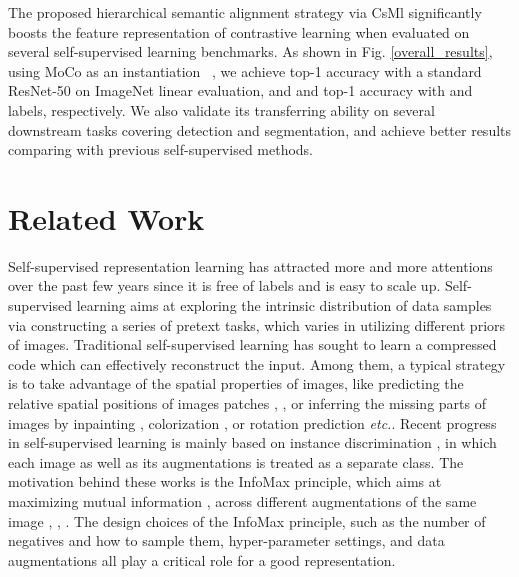 \documentclass[10pt,twocolumn,letterpaper]{article}
\begin{document}
The proposed hierarchical semantic alignment strategy via CsMl significantly boosts the feature representation of contrastive learning when evaluated on several self-supervised learning benchmarks. As shown in Fig. \ref{overall_results}, using MoCo as an instantiation  \cite{he2020momentum}, we achieve  top-1 accuracy with a standard ResNet-50 on ImageNet linear evaluation, and  and  top-1 accuracy with  and  labels, respectively. We also validate its transferring ability on several downstream tasks covering detection and segmentation, and achieve better results comparing with previous self-supervised methods.

\section{Related Work}
Self-supervised representation learning has attracted more and more attentions over the past few years since it is free of labels and is easy to scale up. Self-supervised learning aims at exploring the intrinsic distribution of data samples via constructing a series of pretext tasks, which varies in utilizing different priors of images. Traditional self-supervised learning has sought to learn a compressed code which can effectively reconstruct the input. Among them, a typical strategy is to take advantage of the spatial properties of images, like predicting the relative spatial positions of images patches \cite{doersch2015unsupervised}, \cite{noroozi2016unsupervised}, or inferring the missing parts of images by inpainting \cite{pathak2016context}, colorization \cite{zhang2016colorful}, or rotation prediction \cite{gidaris2018unsupervised} \emph{etc.}. Recent progress in self-supervised learning is mainly based on instance discrimination \cite{wu2018unsupervised}, in which each image as well as its augmentations is treated as a separate class. The motivation behind these works is the InfoMax principle, which aims at maximizing mutual information \cite{tian2019contrastive}, \cite{wu2018unsupervised} across different augmentations of the same image \cite{chen2020simple}, \cite{he2020momentum}, \cite{tian2019contrastive}. The design choices of the InfoMax principle, such as the number of negatives and how to sample them, hyper-parameter settings, and data augmentations all play a critical role for a good representation.
\end{document}
